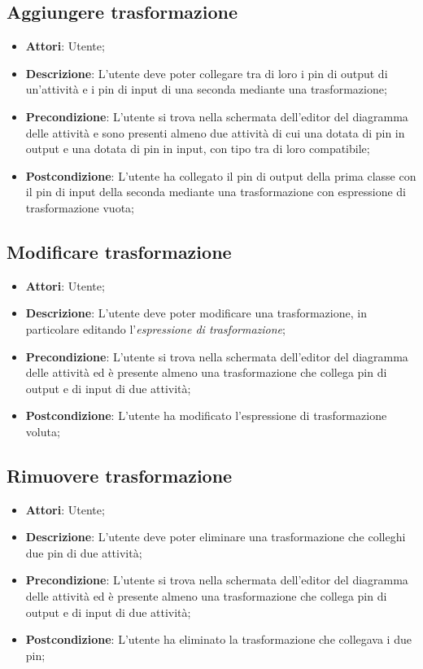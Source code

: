\documentclass[../AnalisiDeiRequisiti.tex]{subfiles}
\begin{document}
	\subsection{Aggiungere trasformazione}
	\begin{itemize}
		\item \textbf{Attori}: Utente;
		\item \textbf{Descrizione}: L’utente deve poter collegare tra di loro i pin di output di un’attività e i pin di input di una seconda mediante una trasformazione;
		\item \textbf{Precondizione}: L’utente si trova nella schermata dell’editor del diagramma delle attività e sono presenti almeno due attività di cui una dotata di pin in output e una dotata di pin in input, con tipo tra di loro compatibile;
		\item \textbf{Postcondizione}: L’utente ha collegato il pin di output della prima classe con il pin di input della seconda mediante una trasformazione con espressione di trasformazione vuota;
	\end{itemize}
	
	\subsection{Modificare trasformazione}
	\begin{itemize}
		\item \textbf{Attori}: Utente;
		\item \textbf{Descrizione}: L’utente deve poter modificare una trasformazione, in particolare editando l’\textit{espressione di trasformazione};
		\item \textbf{Precondizione}: L’utente si trova nella schermata dell’editor del diagramma delle attività ed è presente almeno una trasformazione che collega pin di output e di input di due attività;
		\item \textbf{Postcondizione}: L’utente ha modificato l’espressione di trasformazione voluta;
	\end{itemize}
	
	\subsection{Rimuovere trasformazione}
	\begin{itemize}
		\item \textbf{Attori}: Utente;
		\item \textbf{Descrizione}: L’utente deve poter eliminare una trasformazione che colleghi due pin di due attività;
		\item \textbf{Precondizione}: L’utente si trova nella schermata dell’editor del diagramma delle attività ed è presente almeno una trasformazione che collega pin di output e di input di due attività;
		\item \textbf{Postcondizione}: L’utente ha eliminato la trasformazione che collegava i due pin;
	\end{itemize}
	
\end{document}
